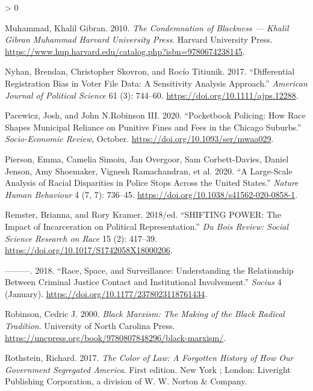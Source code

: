 \documentclass[
  12pt,
]{article}
\newlength{\cslhangindent}
\newenvironment{CSLReferences}[2] %
 {%
  \setlength{\parindent}{0pt}
  \ifodd #1 \everypar{\setlength{\hangindent}{\cslhangindent}}\ignorespaces\fi
  \ifnum #2 > 0
  \setlength{\parskip}{#2\baselineskip}
  \fi
 }%
 {}
\begin{document}
\begin{CSLReferences}{1}{0}
\leavevmode\hypertarget{ref-Muhammad2010}{}%
Muhammad, Khalil Gibran. 2010. \emph{The {Condemnation} of {Blackness} --- {Khalil Gibran Muhammad} \textbar{} {Harvard University Press}}. {Harvard University Press}. \url{https://www.hup.harvard.edu/catalog.php?isbn=9780674238145}.

\leavevmode\hypertarget{ref-Nyhan2017}{}%
Nyhan, Brendan, Christopher Skovron, and Rocío Titiunik. 2017. {``Differential {Registration Bias} in {Voter File Data}: {A Sensitivity Analysis Approach}.''} \emph{American Journal of Political Science} 61 (3): 744--60. \url{https://doi.org/10.1111/ajps.12288}.

\leavevmode\hypertarget{ref-Pacewicz2020}{}%
Pacewicz, Josh, and John N.Robinson III. 2020. {``Pocketbook Policing: {How} Race Shapes Municipal Reliance on Punitive Fines and Fees in the {Chicago} Suburbs.''} \emph{Socio-Economic Review}, October. \url{https://doi.org/10.1093/ser/mwaa029}.

\leavevmode\hypertarget{ref-Pierson2020}{}%
Pierson, Emma, Camelia Simoiu, Jan Overgoor, Sam Corbett-Davies, Daniel Jenson, Amy Shoemaker, Vignesh Ramachandran, et al. 2020. {``A Large-Scale Analysis of Racial Disparities in Police Stops Across the {United States}.''} \emph{Nature Human Behaviour} 4 (7, 7): 736--45. \url{https://doi.org/10.1038/s41562-020-0858-1}.

\leavevmode\hypertarget{ref-Remster2018}{}%
Remster, Brianna, and Rory Kramer. 2018/ed. {``{SHIFTING POWER}: {The Impact} of {Incarceration} on {Political Representation}.''} \emph{Du Bois Review: Social Science Research on Race} 15 (2): 417--39. \url{https://doi.org/10.1017/S1742058X18000206}.

\leavevmode\hypertarget{ref-Remster2018a}{}%
---------. 2018. {``Race, {Space}, and {Surveillance}: {Understanding} the {Relationship} Between {Criminal Justice Contact} and {Institutional Involvement}.''} \emph{Socius} 4 (January). \url{https://doi.org/10.1177/2378023118761434}.

\leavevmode\hypertarget{ref-Robinson2000}{}%
Robinson, Cedric J. 2000. \emph{Black {Marxism}: The {Making} of the {Black Radical Tradition}}. {University of North Carolina Press}. \url{https://uncpress.org/book/9780807848296/black-marxism/}.

\leavevmode\hypertarget{ref-Rothstein2017}{}%
Rothstein, Richard. 2017. \emph{The Color of Law: A Forgotten History of How Our Government Segregated {America}}. First edition. {New York ; London}: {Liveright Publishing Corporation, a division of W. W. Norton \& Company}.


\end{CSLReferences}
\end{document}
